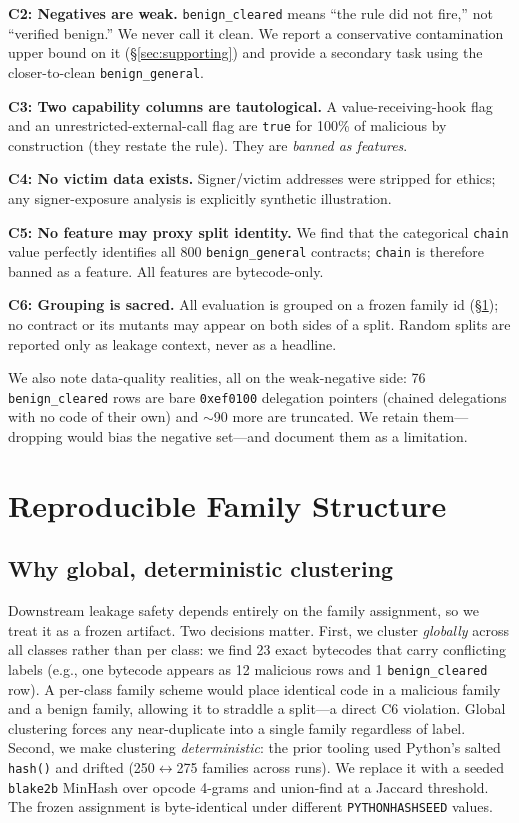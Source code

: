 \documentclass[conference]{IEEEtran}
\newcommand{\code}[1]{\texttt{#1}}
\begin{document}
\noindent\textbf{C2: Negatives are weak.} \code{benign\_cleared} means ``the rule did not
fire,'' not ``verified benign.'' We never call it clean. We report a conservative
contamination upper bound on it (\S\ref{sec:supporting}) and provide a secondary task using
the closer-to-clean \code{benign\_general}.

\noindent\textbf{C3: Two capability columns are tautological.} A value-receiving-hook flag
and an unrestricted-external-call flag are \code{true} for 100\% of malicious by
construction (they restate the rule). They are \emph{banned as features}.

\noindent\textbf{C4: No victim data exists.} Signer/victim addresses were stripped for
ethics; any signer-exposure analysis is explicitly synthetic illustration.

\noindent\textbf{C5: No feature may proxy split identity.} We find that the categorical
\code{chain} value perfectly identifies all 800 \code{benign\_general} contracts; \code{chain}
is therefore banned as a feature. All features are bytecode-only.

\noindent\textbf{C6: Grouping is sacred.} All evaluation is grouped on a frozen family id
(\S\ref{sec:family}); no contract or its mutants may appear on both sides of a split. Random
splits are reported only as leakage context, never as a headline.

We also note data-quality realities, all on the weak-negative side: 76 \code{benign\_cleared}
rows are bare \code{0xef0100} delegation pointers (chained delegations with no code of their
own) and $\sim$90 more are truncated. We retain them---dropping would bias the negative
set---and document them as a limitation.

\section{Reproducible Family Structure}
\label{sec:family}

\subsection{Why global, deterministic clustering}
Downstream leakage safety depends entirely on the family assignment, so we treat it as a
frozen artifact. Two decisions matter. First, we cluster \emph{globally} across all classes
rather than per class: we find 23 exact bytecodes that carry conflicting labels (e.g., one
bytecode appears as 12 malicious rows and 1 \code{benign\_cleared} row). A per-class family
scheme would place identical code in a malicious family and a benign family, allowing it to
straddle a split---a direct C6 violation. Global clustering forces any near-duplicate into a
single family regardless of label. Second, we make clustering \emph{deterministic}: the prior
tooling used Python's salted \code{hash()} and drifted (250$\leftrightarrow$275 families across
runs). We replace it with a seeded \code{blake2b} MinHash over opcode 4-grams and union-find at
a Jaccard threshold. The frozen assignment is byte-identical under different
\code{PYTHONHASHSEED} values.
\end{document}
